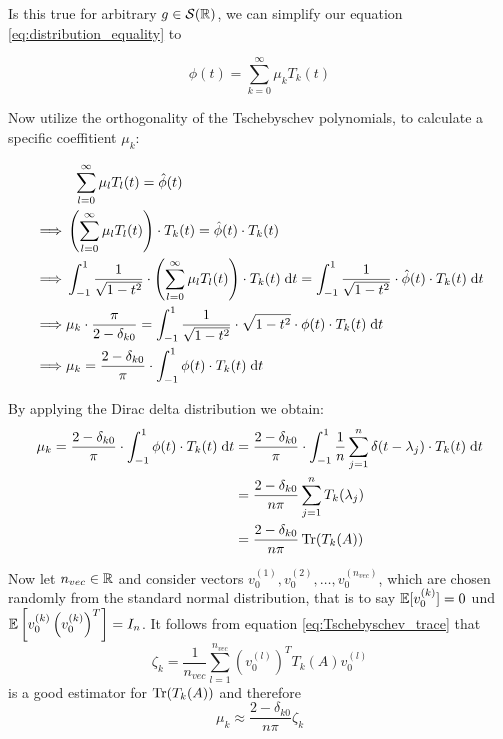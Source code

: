 Is this true for arbitrary $g \in \mathcal{S}(\mathbb{R})$, we can simplify our equation \ref{eq:distribution_equality} to

\begin{equation} \label{eq:Tschebyschev-Erweiterung}
    \hat{\phi}(t) = \sum_{k = 0}^{\infty} \mu_k T_k(t)
\end{equation}

Now utilize the orthogonality of the Tschebyschev polynomials, to calculate a specific coeffitient $\mu_k$:

\begin{align*}
    & \; \; \sum_{l = 0}^{\infty} \mu_l T_l(t) = \hat{\phi}(t) \\
    \implies & \left(\sum_{l = 0}^{\infty} \mu_l T_l(t)\right) \cdot T_k(t) = \hat{\phi}(t) \cdot T_k(t)\\
    \implies & \int_{-1}^1 \frac{1}{\sqrt{1 - t^2}} \cdot \left(\sum_{l = 0}^{\infty} \mu_l T_l(t)\right) \cdot T_k(t) \;\mathrm{d}t = \int_{-1}^1 \frac{1}{\sqrt{1 - t^2}} \cdot \hat{\phi}(t) \cdot T_k(t) \;\mathrm{d}t\\
    \implies & \mu_k \cdot \frac{\pi}{2 - \delta_{k0}} = \int_{-1}^1 \frac{1}{\sqrt{1 - t^2}} \cdot \sqrt{1 - t^2} \cdot \phi(t) \cdot T_k(t) \;\mathrm{d}t\\
    \implies & \mu_k = \frac{2 - \delta_{k0}}{\pi} \cdot \int_{-1}^1 \phi(t) \cdot T_k(t) \;\mathrm{d}t\\
\end{align*}

By applying the Dirac delta distribution we obtain:
\begin{align*}
    \mu_k = \frac{2 - \delta_{k0}}{\pi} \cdot \int_{-1}^1 \phi(t) \cdot T_k(t) \;\mathrm{d}t &= \frac{2 - \delta_{k0}}{\pi} \cdot \int_{-1}^1 \frac{1}{n} \sum_{j = 1}^n \delta(t - \lambda_j) \cdot T_k(t) \;\mathrm{d}t \\
    &= \frac{2 - \delta_{k0}}{n \pi} \sum_{j = 1}^n T_k(\lambda_j)\\
    &= \frac{2 - \delta_{k0}}{n \pi} \operatorname{Tr}(T_k(A))
\end{align*}

Now let $n_{vec} \in \mathbb{R}$ and consider vectors $v_0^{(1)}, v_0^{(2)}, \dots, v_0^{(n_{vec})}$,
which are chosen randomly from the standard normal distribution,
that is to say $\mathbb{E}[v_0^{(k)}] = 0$ und $\mathbb{E}\left[v_0^{(k)}\left(v_0^{(k)}\right)^T\right] = I_n$.
It follows from equation \ref{eq:Tschebyschev_trace} that
\[
\zeta_k = \frac{1}{n_{vec}} \sum_{l = 1}^{n_{vec}} \left( v_0^{(l)} \right)^T T_k(A) v_0^{(l)}
\]
is a good estimator for $\operatorname{Tr}(T_k(A))$ and therefore
\[
\mu_k \approx \frac{2 - \delta_{k0}}{n \pi} \zeta_k
\]

